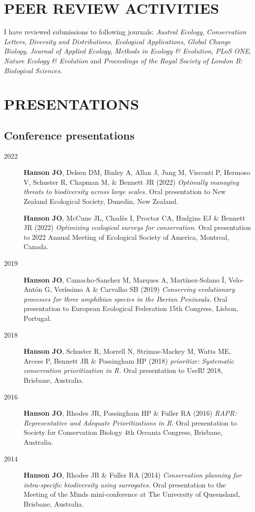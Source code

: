\documentclass[12pt,a4paper]{article}
\begin{document}
\section*{PEER REVIEW ACTIVITIES}

I have reviewed submissions to following journals: \textit{Austral Ecology}, \textit{Conservation Letters}, \textit{Diversity and Distributions}, \textit{Ecological Applications}, \textit{Global Change Biology}, \textit{Journal of Applied Ecology}, \textit{Methods in Ecology \& Evolution}, \textit{PLoS ONE}, \textit{Nature Ecology \& Evolution} and \textit{Proceedings of the Royal Society of London B: Biological Sciences}.

\section*{PRESENTATIONS}
\subsection*{Conference presentations}
\begin{description}

\item[2022] \textbf{Hanson JO}, Delsen DM, Binley A, Allan J, Jung M, Visconti P, Hermoso V, Schuster R, Chapman M, \& Bennett JR (2022) \textit{Optimally managing threats to biodiversity across large scales.} Oral presentation to New Zealand Ecological Society, Dunedin, New Zealand.

\textbf{Hanson JO}, McCune JL, Chadès I, Proctor CA, Hudgins EJ \& Bennett JR (2022) \textit{Optimizing ecological surveys for conservation.} Oral presentation to 2022 Annual Meeting of Ecological Society of America, Montreal, Canada.

\item[2019] \textbf{Hanson JO}, Camacho-Sanchez M, Marques A, Martínez-Solano Í, Velo-Antón G, Veríssimo A \& Carvalho SB (2019) \textit{Conserving evolutionary processes for three amphibian species in the Iberian Peninsula.} Oral presentation to European Ecological Federation 15th Congress, Lisbon, Portugal.

\item[2018] \textbf{Hanson JO}, Schuster R, Morrell N, Strimas-Mackey M, Watts ME, Arcese P, Bennett JR \& Possingham HP (2018) \textit{prioritizr: Systematic conservation prioritization in R.} Oral presentation to UseR! 2018, Brisbane, Australia.

\item[2016] \textbf{Hanson JO}, Rhodes JR, Possingham HP \& Fuller RA (2016) \textit{RAPR: Representative and Adequate Prioritizations in R}. Oral presentation to Society for Conservation Biology 4th Oceania Congress, Brisbane, Australia.

\item[2014] \textbf{Hanson JO}, Rhodes JR \& Fuller RA (2014) \textit{Conservation planning for intra-specific biodiversity using surrogates.} Oral presentation to the Meeting of the Minds mini-conference at The University of Queensland, Brisbane, Australia.

\end{description}
\end{document}
